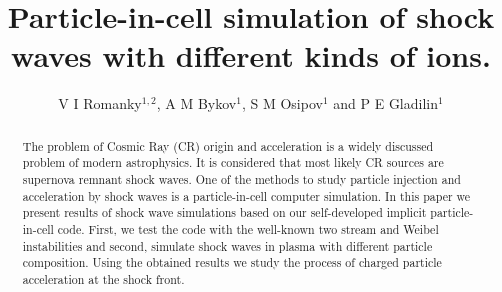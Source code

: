 \documentclass[a4paper]{jpconf}
\begin{document}
\title{Particle-in-cell simulation of shock waves with different kinds of ions.}

\author{V I Romanky$^{1,2}$, A M Bykov$^1$, S M Osipov$^1$ and P E Gladilin$^1$}

\address{$^1$ Ioffe Institute, 26 Politekhnicheskaya st., St. Petersburg 194021, Russia}
\address{$^2$ 
Sternberg Astronomical Institute, Moscow State University
 Universitetsky pr., 13, Moscow 119234, Russia}


\begin{abstract}
The problem of Cosmic Ray (CR) origin and acceleration is a widely discussed problem of
modern astrophysics. It is considered that most likely CR sources are supernova remnant
shock waves. One of the methods to study particle injection and acceleration by shock
waves is a particle-in-cell computer simulation. In this paper we present results of shock
wave simulations based on our self-developed implicit particle-in-cell code. First, we test the code
with the well-known two stream and Weibel instabilities and second, simulate shock waves in
plasma with different particle composition. Using the obtained results we study the
process of charged particle acceleration at the shock front.
\end{abstract}






\end{document}
